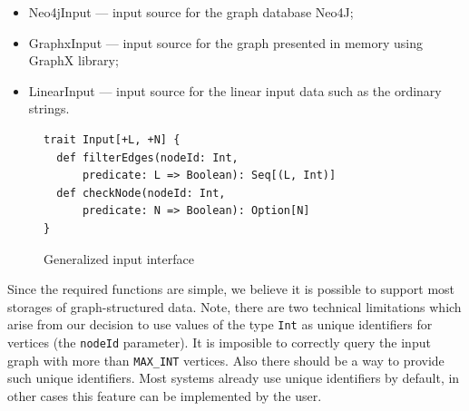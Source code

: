 
\begin{itemize}
    \item Neo4jInput --- input source for the graph database Neo4J;
    \item GraphxInput --- input source for the graph presented in memory using GraphX library;
    \item LinearInput --- input source for the linear input data such as the ordinary strings.
\end{itemize}

\begin{figure}[h]
\begin{lstlisting}
trait Input[+L, +N] {
  def filterEdges(nodeId: Int, 
      predicate: L => Boolean): Seq[(L, Int)]
  def checkNode(nodeId: Int, 
      predicate: N => Boolean): Option[N]
}

\end{lstlisting}
\caption{Generalized input interface}
\label{fig:input}
\end{figure}

Since the required functions are simple, we believe it is possible to support most storages of graph-structured data.
Note, there are two technical limitations which arise from our decision to use values of the type \lstinline{Int} as unique identifiers for vertices (the \lstinline{nodeId} parameter).
It is imposible to correctly query the input graph with more than \lstinline{MAX_INT} vertices. 
Also there should be a way to provide such unique identifiers. Most systems already use unique identifiers by default, in other cases this feature can be implemented by the user.




